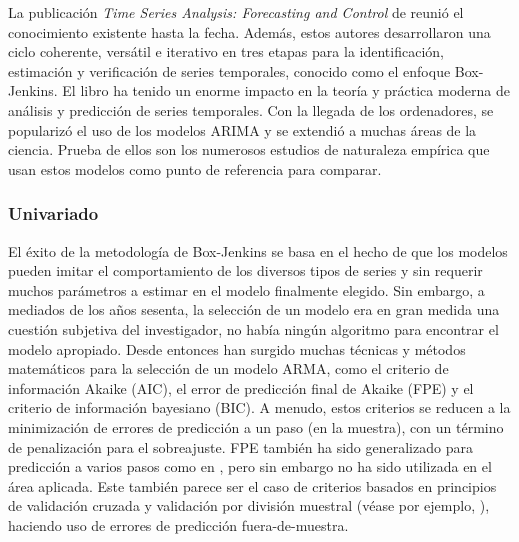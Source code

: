 \documentclass{llncs}
\begin{document}
La publicación \emph{Time Series Analysis: Forecasting and Control} de \cite{Box1976} reunió el conocimiento existente hasta la fecha. Además, estos autores desarrollaron una ciclo coherente, versátil e iterativo en tres etapas para la identificación, estimación y verificación de series temporales, conocido como el enfoque Box-Jenkins. El libro ha tenido un enorme impacto en la teoría y práctica moderna de análisis y predicción de series temporales. Con la llegada de los ordenadores, se popularizó el uso de los modelos ARIMA y se extendió a muchas áreas de la ciencia. Prueba de ellos son los numerosos estudios de naturaleza empírica que usan estos modelos como punto de referencia para comparar.

\begin{table}
\caption{Lista de ejemplos de aplicaciones reales}
\end{table}
\subsubsection{Univariado}

El éxito de la metodología de Box-Jenkins se basa en el hecho de que los modelos pueden imitar el comportamiento de los diversos tipos de series y sin requerir muchos parámetros a estimar en el modelo finalmente elegido. Sin embargo, a mediados de los años sesenta, la selección de un modelo era en gran medida una cuestión subjetiva del investigador, no había ningún algoritmo para encontrar el modelo apropiado. Desde entonces han surgido muchas técnicas y métodos matemáticos para la selección de un modelo ARMA, como el criterio de información Akaike (AIC), el error de predicción final de Akaike (FPE) y el criterio de información bayesiano (BIC). A menudo, estos criterios se reducen a la minimización de errores de predicción a un paso (en la muestra), con un término de penalización para el sobreajuste. FPE también ha sido generalizado para predicción a varios pasos como en \cite{Bhansali1999295}, pero sin embargo no ha sido utilizada en el área aplicada. Este también parece ser el caso de criterios basados en principios de validación cruzada y validación por división muestral (véase por ejemplo, \cite{West19961084}), haciendo uso de errores de predicción fuera-de-muestra.
\end{document}
